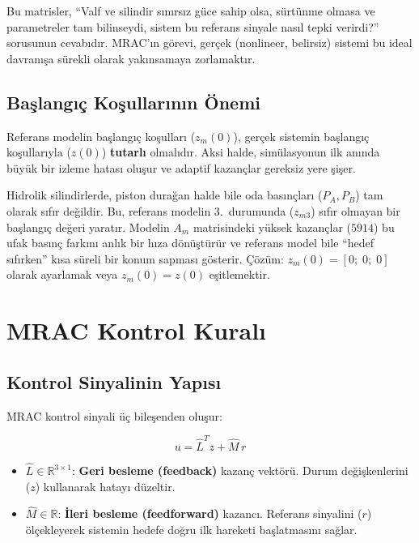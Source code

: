 \documentclass[12pt,a4paper]{article}
\begin{document}
\begin{kavram}
Bu matrisler, ``Valf ve silindir sınırsız güce sahip olsa, sürtünme olmasa ve parametreler tam bilinseydi, sistem bu referans sinyale nasıl tepki verirdi?'' sorusunun cevabıdır. MRAC'ın görevi, gerçek (nonlineer, belirsiz) sistemi bu ideal davranışa sürekli olarak yakınsamaya zorlamaktır.
\end{kavram}

\subsection{Başlangıç Koşullarının Önemi}

Referans modelin başlangıç koşulları ($z_m(0)$), gerçek sistemin başlangıç koşullarıyla ($z(0)$) \textbf{tutarlı} olmalıdır. Aksi halde, simülasyonun ilk anında büyük bir izleme hatası oluşur ve adaptif kazançlar gereksiz yere şişer.

\begin{dikkat}
Hidrolik silindirlerde, piston durağan halde bile oda basınçları ($P_A, P_B$) tam olarak sıfır değildir. Bu, referans modelin 3.~durumunda ($z_{m3}$) sıfır olmayan bir başlangıç değeri yaratır. Modelin $A_m$ matrisindeki yüksek kazançlar ($5914$) bu ufak basınç farkını anlık bir hıza dönüştürür ve referans model bile ``hedef sıfırken'' kısa süreli bir konum sapması gösterir. Çözüm: $z_m(0) = [0;\; 0;\; 0]$ olarak ayarlamak veya $z_m(0) = z(0)$ eşitlemektir.
\end{dikkat}

\section{MRAC Kontrol Kuralı}
\label{sec:mrac}

\subsection{Kontrol Sinyalinin Yapısı}

MRAC kontrol sinyali üç bileşenden oluşur:

\begin{equation}
    \boxed{u = \hat{L}^T z + \hat{M}\,r}
    \label{eq:control_law}
\end{equation}

\begin{itemize}
    \item $\hat{L} \in \mathbb{R}^{3\times1}$: \textbf{Geri besleme (feedback)} kazanç vektörü. Durum değişkenlerini ($z$) kullanarak hatayı düzeltir.
    \item $\hat{M} \in \mathbb{R}$: \textbf{İleri besleme (feedforward)} kazancı. Referans sinyalini ($r$) ölçekleyerek sistemin hedefe doğru ilk hareketi başlatmasını sağlar.
\end{itemize}
\end{document}
